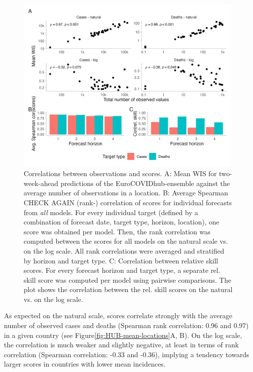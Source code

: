 \documentclass{article}
\begin{document}
\begin{figure}[h!]
    \centering
    \includegraphics[width=0.99\textwidth]{output/figures/HUB-correlations.png}
    \caption{Correlations between observations and scores. A: Mean WIS for two-week-ahead predictions of the EuroCOVIDhub-ensemble against the average number of observations in a location. B: Average Spearman CHECK AGAIN (rank-) correlation of scores for individual forecasts from \textit{all} models. For every individual target (defined by a combination of forecast date, target type, horizon, location), one score was obtained per model. Then, the rank correlation was computed between the scores for all models on the natural scale vs. on the log scale. All rank correlations were averaged and stratified by horizon and target type. C: Correlation between relative skill scores. For every forecast horizon and target type, a separate rel. skill score was computed per model using pairwise comparisons. The plot shows the correlation between the rel. skill scores on the natural vs. on the log scale.}
    \label{fig:HUB-cors}
\end{figure}

As expected on the natural scale, scores correlate strongly with the average number of observed cases and deaths (Spearman rank correlation: 0.96 and 0.97) in a given country (see Figure\ref{fig:HUB-mean-locations}A, B).
On the log scale, the correlation is much weaker and slightly negative, at least in terms of rank correlation (Spearman correlation: -0.33 and -0.36), implying a tendency towards larger scores in countries with lower mean incidences. 
\end{document}
